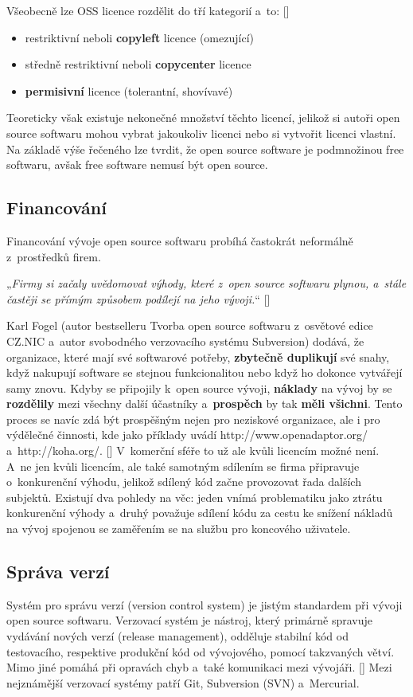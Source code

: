 \documentclass[
	11pt, oneside, printed, final, palatino, monochrome
	microtype,
	table,   %
	lof,     %
	lot     %
]{fithesis3}
\makeatletter
\newcommand{\citepages}[2]{[\cite[#1]{#2}]}
\newcommand{\bold}[1]{\textbf{#1}}
\newcommand{\citace}[1]{„\textit{#1}“} %
\newcommand{\mezera}{\bigskip}
\makeatother
\begin{document}
{Všeobecně lze OSS licence rozdělit do tří kategorií a~to: \citepages{9-10}{6226510}
\begin{itemize}
\item restriktivní neboli \bold{copyleft} licence (omezující)
\item středně restriktivní neboli \bold{copycenter} licence
\item \bold{permisivní} licence (tolerantní, shovívavé)
\end{itemize}
Teoreticky však existuje nekonečné množství těchto licencí, jelikož si autoři open source softwaru mohou vybrat jakoukoliv licenci nebo si vytvořit licenci vlastní.
Na základě výše řečeného lze tvrdit, že open source software je podmnožinou free softwaru, avšak free software nemusí být open source.

\subsection{Financování}
Financování vývoje open source softwaru probíhá častokrát neformálně z~prostředků firem.

\mezera 
\citace{Firmy si začaly uvědomovat výhody, které z~open source softwaru plynou, a~stále častěji se přímým způsobem podílejí na jeho vývoji.} \citepages{129}{Fogel2012}
\mezera

Karl Fogel (autor bestselleru Tvorba open source softwaru z~osvětové edice CZ.NIC a~autor svobodného verzovacího systému Subversion) dodává, že organizace, které mají své softwarové potřeby, \bold{zbytečně duplikují} své snahy, když nakupují software se stejnou funkcionalitou nebo když ho dokonce vytvářejí samy znovu. Kdyby se připojily k~open source vývoji, \bold{náklady} na vývoj by se \bold{rozdělily} mezi všechny další účastníky a~\bold{prospěch} by tak \bold{měli všichni}. Tento proces se navíc zdá být prospěšným nejen pro neziskové organizace, ale i pro výdělečné činnosti, kde jako příklady uvádí http://www.openadaptor.org/ a~http://koha.org/. \citepages{130-132}{Fogel2012} V~komerční sféře to už ale kvůli licencím možné není. A~ne jen kvůli licencím, ale také samotným sdílením se firma připravuje o~konkurenční výhodu, jelikož sdílený kód začne provozovat řada dalších subjektů. Existují dva pohledy na věc: jeden vnímá problematiku jako ztrátu konkurenční výhody a~druhý považuje sdílení kódu za cestu ke snížení nákladů na vývoj spojenou se zaměřením se na službu pro koncového uživatele.


\subsection{Správa verzí}
Systém pro správu verzí (version control system) je jistým standardem při vývoji open source softwaru. Verzovací systém je nástroj, který primárně spravuje vydávání nových verzí (release management), odděluje stabilní kód od testovacího, respektive produkční kód od vývojového, pomocí takzvaných větví. Mimo jiné pomáhá při opravách chyb a~také komunikaci mezi vývojáři. \citepages{17-21, 59-64}{Chaconc2009} Mezi nejznámější verzovací systémy patří Git, Subversion (SVN) a~Mercurial.

}
\end{document}
